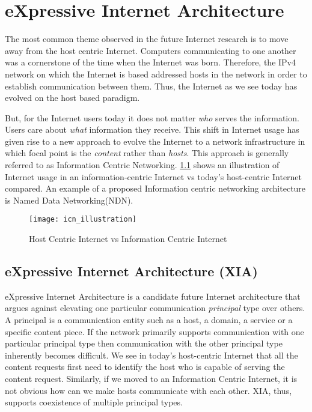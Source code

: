 \chapter{eXpressive Internet Architecture}
\label{chap:ccnxia}

The most common theme observed in the future Internet research is to
move away from the host centric Internet. Computers communicating to
one another was a cornerstone of the time when the Internet was
born. Therefore, the IPv4 network on which the Internet is based
addressed hosts in the network in order to establish communication
between them. Thus, the Internet as we see today has evolved on the
host based paradigm.

But, for the Internet users today it does not matter \emph{who} serves
the information. Users care about \emph{what} information they
receive. This shift in Internet usage has given rise to a new approach
to evolve the Internet to a network infrastructure in which focal
point is the \emph{content} rather than \emph{hosts}. This approach is
generally referred to as Information Centric
Networking. \ref{fig:icn_illustration} shows an illustration of
Internet usage in an information-centric Internet vs today's
host-centric Internet compared. An example of a proposed Information
centric networking architecture is Named Data Networking(NDN).

\begin{figure}
  \begin{center}
    \texttt{[image: icn\_illustration]}
  \end{center}
  \caption{Host Centric Internet vs Information Centric Internet}
  \label{fig:icn_illustration}
\end{figure}

\section{eXpressive Internet Architecture (XIA)}
eXpressive Internet Architecture is a candidate future Internet
architecture that argues against elevating one particular
communication \emph{principal} type over others. A principal is a
communication entity such as a host, a domain, a service or a specific
content piece. If the network primarily supports communication with
one particular principal type then communication with the other
principal type inherently becomes difficult. We see in today's
host-centric Internet that all the content requests first need to
identify the host who is capable of serving the content
request. Similarly, if we moved to an Information Centric Internet, it
is not obvious how can we make hosts communicate with each other. XIA,
thus, supports coexistence of multiple principal types.

